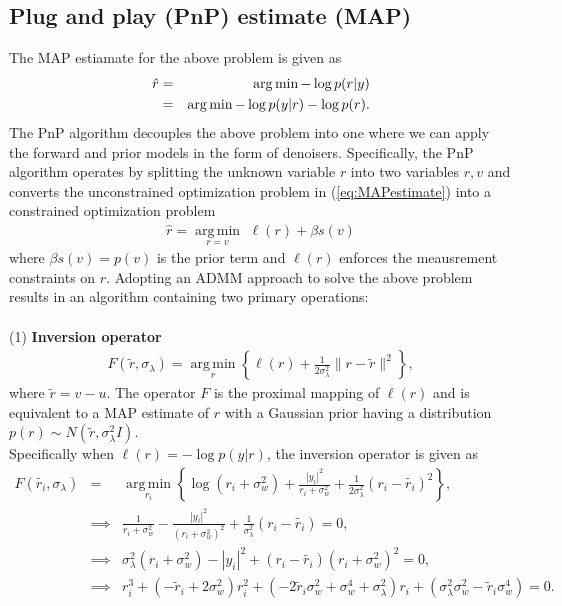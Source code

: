\documentclass[a4paper, 11pt]{article}
\DeclareMathOperator*{\argmin}{arg\,min}
\begin{document}
\subsection{Plug and play (PnP) estimate (MAP)}
The MAP estiamate for the above problem is given as 
\begin{eqnarray}
\hat{r}&=& \argmin -\log p(r|y) \notag\\
&=& \argmin  -\log p(y|r)-\log p(r). \label{eq:MAPestimate}
\end{eqnarray}
The PnP algorithm \cite{PnPalgorithm} decouples the above problem into one where we can apply the forward and prior models in the form of denoisers. Specifically, the PnP algorithm operates by splitting the unknown variable $r$ into two variables $r,v$ and converts the unconstrained optimization problem in (\ref{eq:MAPestimate}) into a constrained optimization problem 
\begin{eqnarray} 
\hat{r}=\underset{r=v}{\argmin} \,\, \ell (r)+\beta s(v)
\end{eqnarray}
where $\beta s(v)=p(v)$ is the prior term and $\ell (r)$ enforces the meausrement constraints on $r$. Adopting an ADMM approach to solve the above problem results in an algorithm containing two primary operations:\\ \\(1) \textbf{Inversion operator} 
\begin{eqnarray*}
F(\tilde{r},\sigma_\lambda)=\underset{r}{\argmin} \left \{ \ell(r)+\frac{1}{2\sigma_\lambda^2} \|r-\tilde{r}\|^2 \right \}, 
\end{eqnarray*}
 where $\tilde{r}=v-u$. The operator $F$ is the proximal mapping of $\ell(r)$ and is equivalent to a MAP estimate of $r$ with a Gaussian prior having a distribution $p(r)\sim N(\tilde{r},\sigma_\lambda^2I)$. \\
Specifically when $\ell(r)=-\log p(y|r)$, the inversion operator is given as 
\begin{eqnarray*}
F(\tilde{r_i},\sigma_\lambda)&=&\underset{r_i}{\argmin} \left \{ \log (r_i+\sigma_w^2)+\frac{|y_i|^2}{r_i+\sigma_w^2}+\frac{1}{2\sigma_\lambda^2} (r_i-\tilde{r_i})^2 \right \}, \\
&\implies&  \frac{1}{r_i+\sigma_w^2}-\frac{|y_i|^2}{(r_i+\sigma_w^2)^2}+\frac{1}{\sigma_\lambda^2} (r_i-\tilde{r_i}) =0, \\
&\implies&  \sigma_\lambda^2(r_i+\sigma_w^2)-|y_i|^2+(r_i-\tilde{r_i})(r_i+\sigma_w^2)^2 =0, \\
&\implies&  r_i^3+(-\tilde{r}_i+2\sigma_w^2)r_i^2+(-2\tilde{r}_{i}\sigma_w^2+\sigma_w^4+\sigma_\lambda^2)r_i+(\sigma_\lambda^2\sigma_w^2-\tilde{r}_i\sigma_w^4 )=0. \\
\end{eqnarray*}
\end{document}
